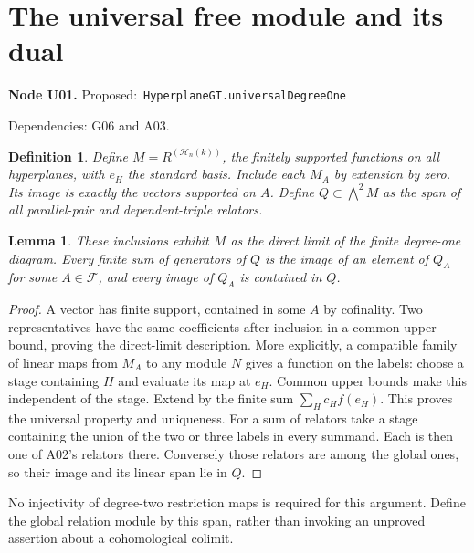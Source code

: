 \documentclass[11pt]{article}
\newtheorem{lemma}[theorem]{Lemma}
\newtheorem{definition}[theorem]{Definition}
\theoremstyle{remark}\newtheorem{remark}[theorem]{Remark}
\newcommand{\cH}{\mathcal H}
\newcommand{\code}[1]{\nolinkurl{#1}}
\newcommand{\node}[3]{\par\Needspace{8\baselineskip}\smallskip\noindent\textbf{Node #1.}\quad
 \textsf{Proposed:}\ \code{#2}\par\noindent
 \textsf{Dependencies:} #3.\par\smallskip}
\begin{document}
\section{The universal free module and its dual}
\label{sec:universal}

\node{U01}{HyperplaneGT.universalDegreeOne}{G06 and A03}
\begin{definition}\label{def:u01}
Define $M=R^{(\cH_n(k))}$, the finitely supported functions on all
hyperplanes, with $e_H$ the standard basis. Include each $M_A$ by
extension by zero. Its image is exactly the vectors supported on
$A$. Define $Q\subset\bigwedge^2M$ as the span of all parallel-pair
and dependent-triple relators.
\end{definition}
\begin{lemma}\label{lem:u01}
These inclusions exhibit $M$ as the direct limit of the finite
degree-one diagram. Every finite sum of generators of $Q$ is the
image of an element of $Q_A$ for some $A\in\mathscr F$, and every
image of $Q_A$ is contained in $Q$.
\end{lemma}
\begin{proof}
A vector has finite support, contained in some $A$ by cofinality.
Two representatives have the same coefficients after inclusion in
a common upper bound, proving the direct-limit description. More
explicitly, a compatible family of linear maps from $M_A$ to any
module $N$ gives a function on the labels: choose a stage containing
$H$ and evaluate its map at $e_H$. Common upper bounds make this
independent of the stage. Extend by the finite sum
$\sum_Hc_H f(e_H)$. This proves the universal property and uniqueness.
For a sum of relators take a stage containing the union of the two
or three labels in every summand. Each is then one of A02's
relators there. Conversely those relators are among the global
ones, so their image and its linear span lie in $Q$.
\end{proof}
No injectivity of degree-two restriction maps is required for this
argument. Define the global relation module by this span, rather
than invoking an unproved assertion about a cohomological colimit.
\end{document}
